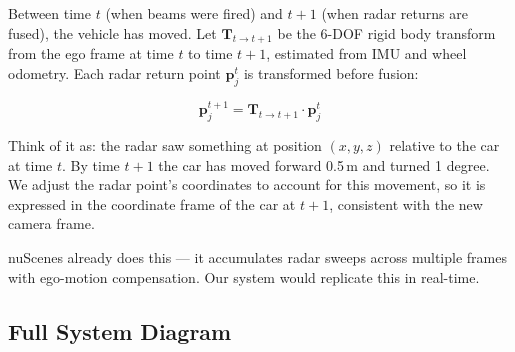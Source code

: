 \documentclass[12pt, a4paper]{article}
\theoremstyle{definition}
\begin{document}
Between time $t$ (when beams were fired) and $t+1$ (when radar returns are
fused), the vehicle has moved. Let $\mathbf{T}_{t\to t+1}$ be the 6-DOF
rigid body transform from the ego frame at time $t$ to time $t+1$,
estimated from IMU and wheel odometry. Each radar return point
$\mathbf{p}_j^t$ is transformed before fusion:

\begin{equation}
  \mathbf{p}_j^{t+1}
  = \mathbf{T}_{t\to t+1} \cdot \mathbf{p}_j^t
  \label{eq:ego_motion}
\end{equation}

\begin{plainbox}
Think of it as: the radar saw something at position $(x,y,z)$ relative to the
car at time $t$. By time $t+1$ the car has moved forward 0.5\,m and turned 1 degree.
We adjust the radar point's coordinates to account for this movement, so it is
expressed in the coordinate frame of the car at $t+1$, consistent with the new
camera frame.

nuScenes already does this --- it accumulates radar sweeps across multiple frames
with ego-motion compensation. Our system would replicate this in real-time.
\end{plainbox}

\subsection{Full System Diagram}
\end{document}
